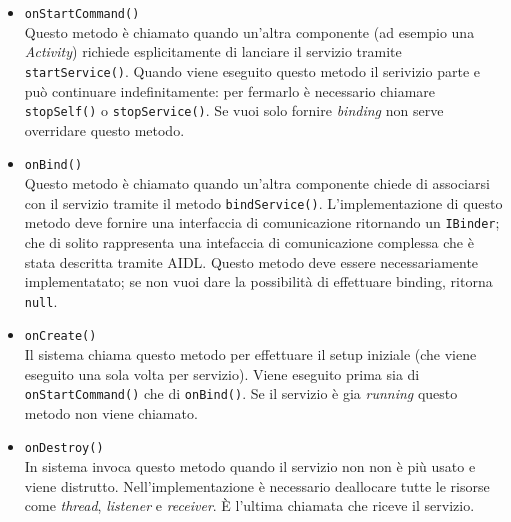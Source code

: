 \begin{itemize}
	\item \texttt{onStartCommand()}\\
	Questo metodo è chiamato quando un'altra componente (ad esempio una \textit{Activity}) richiede esplicitamente di lanciare il servizio tramite \texttt{startService()}. Quando viene eseguito questo metodo il serivizio parte e può continuare indefinitamente: per fermarlo è necessario chiamare \texttt{stopSelf()} o \texttt{stopService()}. Se vuoi solo fornire \textit{binding} non serve overridare questo metodo.
	\item \texttt{onBind()}\\
	Questo metodo è chiamato quando un'altra componente chiede di associarsi con il servizio tramite il metodo \texttt{bindService()}. L'implementazione di questo metodo deve fornire una interfaccia di comunicazione ritornando un \texttt{IBinder}; che di solito rappresenta una intefaccia di comunicazione complessa che è stata descritta tramite AIDL. Questo metodo deve essere necessariamente implementatato; se non vuoi dare la possibilità di effettuare binding, ritorna \texttt{null}.
	\item \texttt{onCreate()}\\
	Il sistema chiama questo metodo per effettuare il setup iniziale (che viene eseguito una sola volta per servizio). Viene eseguito prima sia di \texttt{onStartCommand()} che di \texttt{onBind()}. Se il servizio è gia \textit{running} questo metodo non viene chiamato.
	\item \texttt{onDestroy()}\\
	In sistema invoca questo metodo quando il servizio non non è più usato e viene distrutto. Nell'implementazione è necessario deallocare tutte le risorse come \textit{thread}, \textit{listener} e \textit{receiver}. È l'ultima chiamata che riceve il servizio.
\end{itemize}


